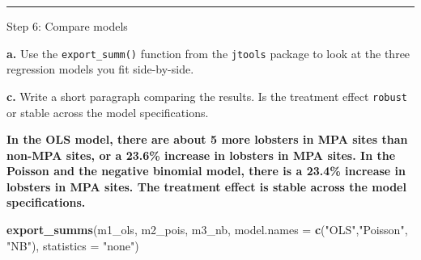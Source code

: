 \documentclass[
]{article}
\newenvironment{Shaded}{\begin{snugshade}}{\end{snugshade}}
\newcommand{\AttributeTok}[1]{\textcolor[rgb]{0.13,0.29,0.53}{#1}}
\newcommand{\FunctionTok}[1]{\textcolor[rgb]{0.13,0.29,0.53}{\textbf{#1}}}
\newcommand{\NormalTok}[1]{#1}
\newcommand{\StringTok}[1]{\textcolor[rgb]{0.31,0.60,0.02}{#1}}
\begin{document}
\begin{center}\rule{0.5\linewidth}{0.5pt}\end{center}

Step 6: Compare models

\textbf{a.} Use the \texttt{export\_summ()} function from the
\texttt{jtools} package to look at the three regression models you fit
side-by-side.

\textbf{c.} Write a short paragraph comparing the results. Is the
treatment effect \texttt{robust} or stable across the model
specifications.

\textbf{In the OLS model, there are about 5 more lobsters in MPA sites
than non-MPA sites, or a 23.6\% increase in lobsters in MPA sites. In
the Poisson and the negative binomial model, there is a 23.4\% increase
in lobsters in MPA sites. The treatment effect is stable across the
model specifications.}

\begin{Shaded}
\begin{Highlighting}[]
\FunctionTok{export\_summs}\NormalTok{(m1\_ols, m2\_pois, m3\_nb,}
             \AttributeTok{model.names =} \FunctionTok{c}\NormalTok{(}\StringTok{"OLS"}\NormalTok{,}\StringTok{"Poisson"}\NormalTok{, }\StringTok{"NB"}\NormalTok{),}
             \AttributeTok{statistics =} \StringTok{"none"}\NormalTok{)}
\end{Highlighting}
\end{Shaded}

 
  \providecommand{\huxb}[2]{\arrayrulecolor[RGB]{#1}\global\arrayrulewidth=#2pt}
  \providecommand{\huxvb}[2]{\color[RGB]{#1}\vrule width #2pt}
  \providecommand{\huxtpad}[1]{\rule{0pt}{#1}}
  \providecommand{\huxbpad}[1]{\rule[-#1]{0pt}{#1}}
\end{document}
